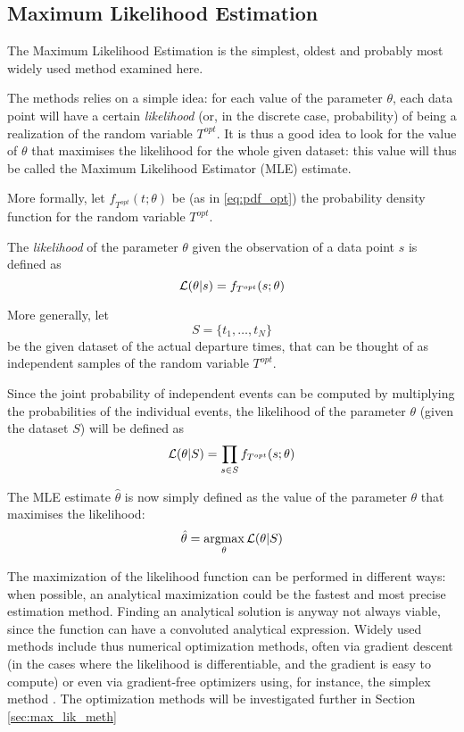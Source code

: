 \subsection{Maximum Likelihood Estimation}
\label{sec:max_lik}
The Maximum Likelihood Estimation is the simplest, oldest and probably most widely used method examined here.

The methods relies on a simple idea:
for each value of the parameter \(\theta\),
each data point will have a certain \textit{likelihood} (or, in the discrete case, probability) of being a realization of the random variable \(T^{opt}\).
It is thus a good idea to look for the value of \(\theta\) that maximises the likelihood for the whole given dataset:
this value will thus be called the Maximum Likelihood Estimator (MLE) estimate.

More formally, let \(f_{T^{opt}}(t; \theta)\) be (as in \eqref{eq:pdf_opt}) the probability density function for the random variable \(T^{opt}\).

The \textit{likelihood} of the parameter \(\theta\) given the observation of a data point \(s\) is defined as
\begin{equation}
  \label{eq:lik_one_point}
  \mathcal{L}(\theta | s)  = f_{T^{opt}}(s; \theta)
\end{equation}

More generally, let
\[S = \{t_1, \dots, t_N\}\]
be the given dataset of the actual departure times,
that can be thought of as independent samples of the random variable \(T^{opt}\).

Since the joint probability of independent events can be computed by multiplying the probabilities of the individual events,
the likelihood of the parameter \(\theta\) (given the dataset \(S\)) will be defined as
\begin{equation}
  \label{eq:lik_def}
  \mathcal{L}(\theta | S) = \prod_{s \in S} f_{T^{opt}}(s; \theta)
\end{equation}

The MLE estimate \(\hat{\theta}\) is now simply defined as the value of the parameter \(\theta\) that maximises the likelihood:
\begin{equation}
  \label{eq:mle_estimate}
  \hat{\theta} = \operatorname*{argmax}_\theta \mathcal{L}(\theta | S)
\end{equation}

The maximization of the likelihood function can be performed in different ways:
when possible, an analytical maximization could be the fastest and most precise estimation method.
Finding an analytical solution is anyway not always viable,
since the function can have a convoluted analytical expression.
Widely used methods include thus numerical optimization methods,
often via gradient descent
(in the cases where the likelihood is differentiable, and the gradient is easy to compute)
or even via gradient-free optimizers using, for instance,
the simplex method \parencite{10.1093/comjnl/7.4.308}.
The optimization methods will be investigated further in Section \ref{sec:max_lik_meth}

